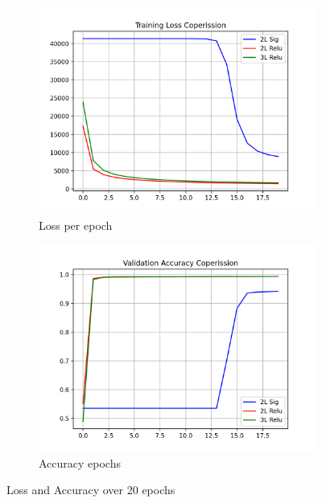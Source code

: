 \documentclass[a4 paper]{article}
\begin{document}
\begin{figure}[h!]
    \centering
    \begin{subfigure}{.5\textwidth}
      \centering
      \includegraphics[width=.9\linewidth]{images/q9_1.png}
      \caption{Loss per epoch}
      \label{fig:sub1}
    \end{subfigure}%
    \begin{subfigure}{.5\textwidth}
      \centering
      \includegraphics[width=.9\linewidth]{images/q9_2.png}
      \caption{Accuracy epochs}
      \label{fig:sub2}
    \end{subfigure}
    \caption{Loss and Accuracy over 20 epochs }
    \label{fig:test}
\end{figure}
\end{document}
